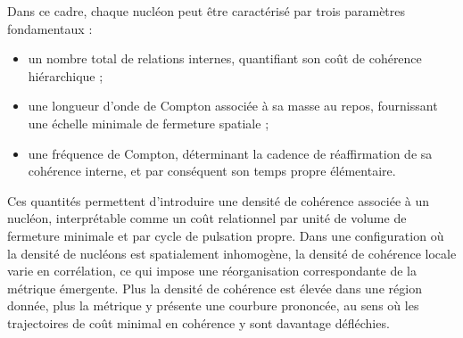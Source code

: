\documentclass[11pt,a4paper]{article}
\begin{document}
Dans ce cadre, chaque nucléon peut être caractérisé par trois paramètres fondamentaux :
\begin{itemize}
  \item un nombre total de relations internes, quantifiant son coût de cohérence hiérarchique ;
  \item une longueur d’onde de Compton associée à sa masse au repos, fournissant une échelle minimale de fermeture spatiale ;
  \item une fréquence de Compton, déterminant la cadence de réaffirmation de sa cohérence interne, et par conséquent son temps propre élémentaire.
\end{itemize}

Ces quantités permettent d’introduire une densité de cohérence associée à un nucléon, interprétable comme un coût relationnel par unité de volume de fermeture minimale et par cycle de pulsation propre. Dans une configuration où la densité de nucléons est spatialement inhomogène, la densité de cohérence locale varie en corrélation, ce qui impose une réorganisation correspondante de la métrique émergente. Plus la densité de cohérence est élevée dans une région donnée, plus la métrique y présente une courbure prononcée, au sens où les trajectoires de coût minimal en cohérence y sont davantage défléchies.
\end{document}
